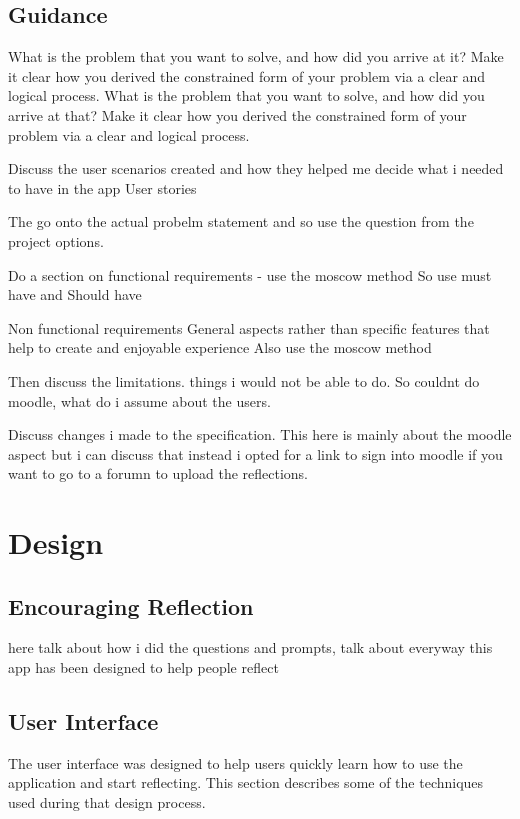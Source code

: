 \documentclass{l4proj}
\begin{document}
\section{Guidance}
What is the problem that you want to solve, and how did you arrive at it?
Make it clear how you derived the constrained form of your problem via a clear and logical process.
What is the problem that you want to solve, and how did you arrive at that?
Make it clear how you derived the constrained form of your problem via a clear and logical process. 
\par 
Discuss the user scenarios created and how they helped me decide what i needed to have in the app
User stories
\par 
The go onto the actual probelm statement and so use the question from the project options.
\par 
Do a section on functional requirements - use the moscow method
So use must have and Should have
\par 
Non functional requirements
General aspects rather than specific features that help to create and enjoyable experience
Also use the moscow method
\par 
Then discuss the limitations. things i would not be able to do.
So couldnt do moodle, what do i assume about the users. 
\par 
Discuss changes i made to the specification. This here is mainly about the moodle aspect but i can discuss 
that instead i opted for a link to sign into moodle if you want to go to a forumn to upload the reflections. 

\chapter{Design}

\section{Encouraging Reflection}
here talk about how i did the questions and prompts, talk about everyway this app has been designed to help people reflect

\section{User Interface}
The user interface was designed to help users quickly learn how to use the application and start reflecting. This section describes
some of the techniques used during that design process.
\end{document}
